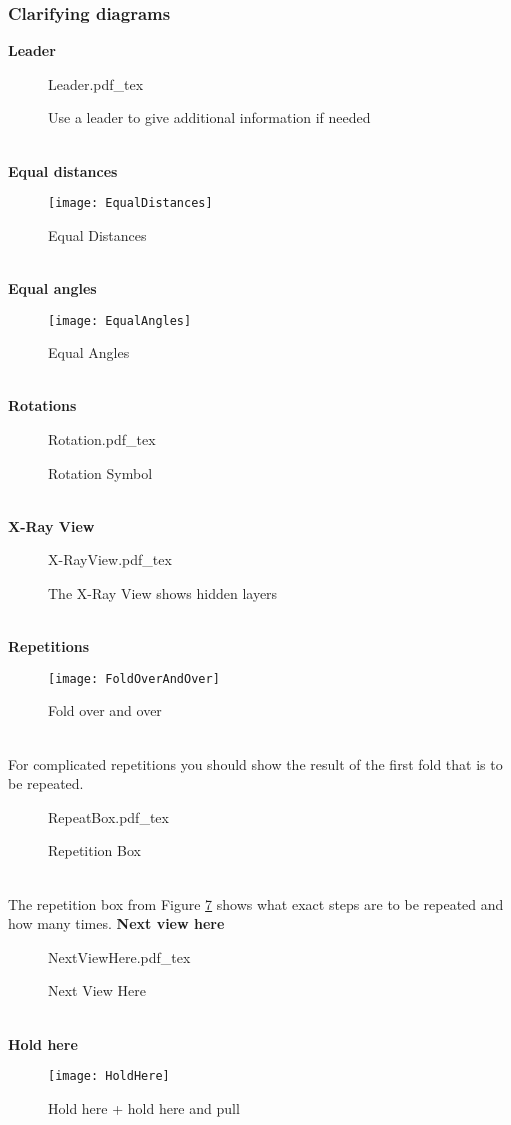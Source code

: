 \newpage

\subsubsection{Clarifying diagrams}

\textbf{Leader}
\begin{figure}[h]
	\centering
	\def\svgwidth{0.3\textwidth}
	{Leader.pdf_tex}
	\caption{Use a leader to give additional information if needed}
	\label{fig:leader}
\end{figure}\\
%
\textbf{Equal distances}
\begin{figure}[h]
	\centering
	\texttt{[image: EqualDistances]}
	\caption{Equal Distances}
	\label{fig:equalDistances}
\end{figure}\\
%
\textbf{Equal angles}
\begin{figure}[h]
	\centering
	\texttt{[image: EqualAngles]}
	\caption{Equal Angles}
	\label{fig:equalAngles}
\end{figure}\\
%
\textbf{Rotations }
\begin{figure}[h]
	\centering
	\def\svgwidth{0.2\textwidth}
	{Rotation.pdf_tex}
	\caption{Rotation Symbol}
	\label{fig:rotation}
\end{figure}\\
\newpage
%
\textbf{X-Ray View}
\begin{figure}[h]
	\centering
	\def\svgwidth{0.7\textwidth}
	{X-RayView.pdf_tex}
	\caption{The X-Ray View shows hidden layers}
	\label{fig:x-rayView}
\end{figure}\\
%
\textbf{Repetitions }
\begin{figure}[h]
	\centering
	\texttt{[image: FoldOverAndOver]}
	\caption{Fold over and over}
	\label{fig:foldOverAndOver}
\end{figure}\\
For complicated repetitions you should show the result of the first fold that is to be repeated.
%
\begin{figure}[h]
	\centering
	\def\svgwidth{0.3\textwidth}
	{RepeatBox.pdf_tex}
	\caption{Repetition Box}
	\label{fig:repeatBox}
\end{figure}\\
The repetition box from Figure \ref{fig:repeatBox} shows what exact steps are to be repeated and how many times.
\newpage
\textbf{Next view here}
\begin{figure}[h]
	\centering
	\def\svgwidth{0.6\textwidth}
	{NextViewHere.pdf_tex}
	\caption{Next View Here}
	\label{fig:nextViewHere}
\end{figure}\\
%
\textbf{Hold here}
\begin{figure}[h]
	\centering
	\texttt{[image: HoldHere]}
	\caption{Hold here + hold here and pull}
	\label{fig:holdHere}
\end{figure}\\

